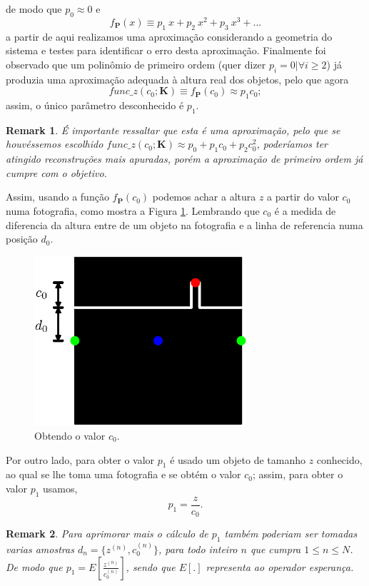 \documentclass[12pt]{article}
\newtheorem*{remark}{Remark}
\begin{document}
de modo que $p_0\approx 0$ e 
\begin{equation}
f_{\mathbf{P}}(x)  \equiv p_1~x+p_2~x^2+p_3~x^3+...
\end{equation}
a partir de aqui realizamos uma aproximação considerando a geometria do sistema
e testes para identificar o erro desta aproximação. Finalmente foi observado
que um polinômio de primeiro ordem (quer dizer $p_i=0|\forall i\geq 2$) 
já produzia uma aproximação adequada à altura real dos objetos,
pelo que agora  
\begin{equation}
func\_z(c_0;\mathbf{K})\equiv f_{\mathbf{P}}(c_0)\approx p_1 c_0;
\end{equation}
assim, o único parâmetro desconhecido é $p_1$.
\begin{remark}
É importante ressaltar que esta é uma aproximação,
pelo que se houvéssemos escolhido
$func\_z(c_0;\mathbf{K}) \approx p_0 + p_1 c_0+p_2 c_0^2$,
poderíamos ter atingido reconstruções mais apuradas,
porém a aproximação de primeiro ordem já cumpre com o objetivo.
\end{remark}

Assim, usando a função $f_{\mathbf{P}}(c_0)$ podemos achar a altura $z$
a partir do valor $c_0$ numa fotografia, como mostra a Figura \ref{fig:setup1}.
Lembrando que $c_0$ é a medida de diferencia da altura entre de um objeto na fotografia
e a linha de referencia numa posição $d_0$.
\begin{figure}[!h]
     \centering
         \includegraphics[width=0.7\textwidth]{Diagrama7.eps}
\caption{Obtendo o valor $c_0$.}
\label{fig:setup1}
\end{figure}

Por outro lado, para obter o valor $p_1$ é usado um objeto de tamanho $z$ conhecido,
ao qual se lhe toma uma fotografia e se obtém o valor $c_0$;
assim, para obter o valor $p_1$ usamos,
\begin{equation}
p_1=\frac{z}{c_0}.
\end{equation}
\begin{remark}
Para aprimorar mais o cálculo de $p_1$ também poderiam ser tomadas varias amostras
$d_n=\{z^{(n)},c_0^{(n)}\}$, para todo inteiro $n$ que cumpra $1\leq n \leq N$.
De modo que $p_1=E\left[\frac{z^{(n)}}{c_0^{(n)}}\right]$, 
sendo que $E[.]$ representa ao operador esperança.
\end{remark}


\printbibliography
\end{document}
